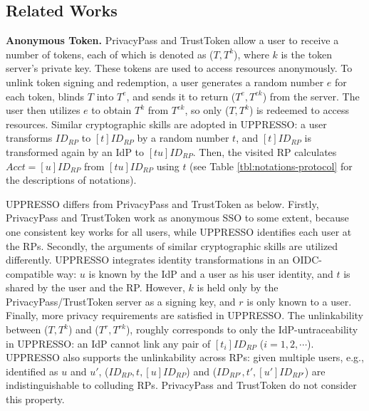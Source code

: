 \subsection{Related Works}%
\label{sec:related}

\noindent\textbf{Anonymous Token.}
%
PrivacyPass and TrustToken \cite{privacypass,trusttoken} allow a user to receive a number of tokens, each of which is denoted as ($T, T^{k}$), where $k$ is the token server's private key.
 These tokens are used to access resources anonymously.
To unlink token signing and redemption,
    a user generates a random number $e$ for each token, blinds $T$ into $T^{e}$,
        and sends it to return ($T^e, T^{ek}$) from the server.
The user then utilizes $e$ to obtain $T^k$ from $T^{ek}$, so only ($T, T^{k}$) is redeemed to access resources.
Similar cryptographic skills are adopted in UPPRESSO:
    a user transforms $ID_{RP}$ to $[t]ID_{RP}$ by a random number $t$,
 and $[t]ID_{RP}$ is transformed again by an IdP to $[tu]ID_{RP}$.
Then, the visited RP calculates $Acct = [u]ID_{RP}$ from $[tu]ID_{RP}$ using $t$
 (see Table \ref{tbl:notations-protocol} for the descriptions of notations).

UPPRESSO differs from PrivacyPass and TrustToken as below.
Firstly,
    PrivacyPass and TrustToken work as anonymous SSO to some extent, because one consistent key works for all users,
while UPPRESSO identifies each user at the RPs.
Secondly,
   the arguments of similar cryptographic skills are utilized differently.
UPPRESSO integrates identity transformations in an OIDC-compatible way:
$u$ is known by the IdP and a user as his user identity, and 
$t$ is shared by the user and the RP. However, 
$k$ is held only by the PrivacyPass/TrustToken server as a signing key,
 and $r$ is only known to a user.
Finally,
more privacy requirements are satisfied in UPPRESSO.
The unlinkability between %
 ($T, T^k$) and ($T^r, T^{rk}$),
roughly corresponds to only the IdP-untraceability in UPPRESSO:
 an IdP cannot link any pair of $[t_i]ID_{RP}$
 ($i = 1, 2, \cdots$).
UPPRESSO also supports the unlinkability across RPs:
given multiple users, e.g., identified as $u$ and $u'$,
    ($ID_{RP}, t, [u]ID_{RP}$) and ($ID_{RP'}, t', [u']ID_{RP'}$) are indistinguishable to
    colluding RPs.
PrivacyPass and TrustToken do not consider this property.

